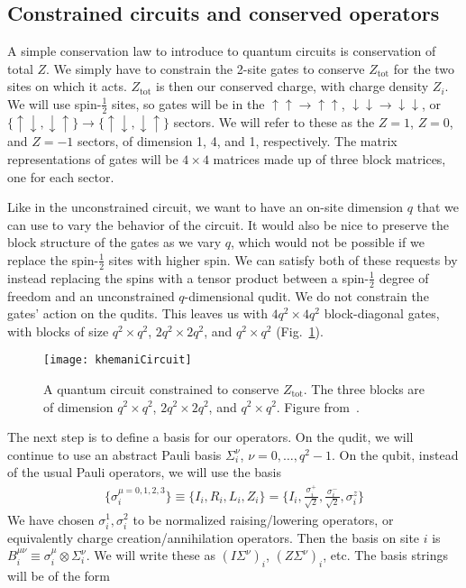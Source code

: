 \documentclass[a4paper,12pt]{article}
\renewcommand{\th}[1]{\frac{1}{#1}}
\renewcommand{\S}{\mathcal{S}}
\newcommand{\tot}{\text{tot}}
\newcommand{\note}[1]{{\color{red}{#1}}}
\begin{document}
\note{In these ``physical systems," it is possible to have approximately conserved charges, i.e. on the localized side of a phase transition\dots}

\subsection{Constrained circuits and conserved operators} \label{sub:ccons}

A simple conservation law to introduce to quantum circuits is conservation of total $Z$. We simply have to constrain the 2-site gates to conserve $Z_\tot$ for the two sites on which it acts. $Z_\tot$ is then our conserved charge, with charge density $Z_i$.
We will use spin-$\th{2}$ sites, so gates will be in the $\uparrow\uparrow\to\uparrow\uparrow$, $\downarrow\downarrow\to\downarrow\downarrow$, or $\{\uparrow\downarrow,\downarrow\uparrow\}\to\{\uparrow\downarrow,\downarrow\uparrow\}$ sectors. We will refer to these as the $Z=1$, $Z=0$, and $Z=-1$ sectors, of dimension 1, 4, and 1, respectively. The matrix representations of gates will be $4\times4$ matrices made up of three block matrices, one for each sector.

Like in the unconstrained circuit, we want to have an on-site dimension $q$ that we can use to vary the behavior of the circuit. It would also be nice to preserve the block structure of the gates as we vary $q$, which would not be possible if we replace the spin-$\th{2}$ sites with higher spin. We can satisfy both of these requests by instead replacing the spins with a tensor product between a spin-$\th{2}$ degree of freedom and an unconstrained $q$-dimensional qudit. We do not constrain the gates' action on the qudits.
This leaves us with $4q^2\times4q^2$ block-diagonal gates, with blocks of size $q^2\times q^2$, $2q^2\times 2q^2$, and $q^2\times q^2$ (Fig.~\ref{fig:khemaniCircuit}).

\begin{figure}
	\centering
	\texttt{[image: khemaniCircuit]}
	\caption{A quantum circuit constrained to conserve $Z_\tot$. The three blocks are of dimension $q^2\times q^2$, $2q^2\times 2q^2$, and $q^2\times q^2$. Figure from~\cite{KhemaniOpSp}.}
	\label{fig:khemaniCircuit}
\end{figure}

The next step is to define a basis for our operators. On the qudit, we will continue to use an abstract Pauli basis $\Sigma_i^\nu$, $\nu=0,\dots,q^2-1$. On the qubit, instead of the usual Pauli operators, we will use the basis~\cite{KhemaniOpSp}
\begin{align}
\{\sigma_i^{\mu=0,1,2,3}\} \equiv \{I_i, R_i, L_i,Z_i\}=\{I_i,\frac{\sigma_i^+}{\sqrt{2}}, \frac{\sigma_i^-}{\sqrt{2}}, \sigma_i^z\}
\end{align}
We have chosen $\sigma_i^1, \sigma_i^2$ to be normalized raising/lowering operators, or equivalently charge creation/annihilation operators. Then the basis on site $i$ is $B_i^{\mu\nu} \equiv \sigma_i^\mu \otimes \Sigma_i^\nu$. We will write these as $(I\Sigma^\nu)_i$, $(Z\Sigma^\nu)_i$, etc. The basis strings will be of the form \note{$\S=\otimes_iB_i^{\mu_i\nu_i}$.}
\end{document}
